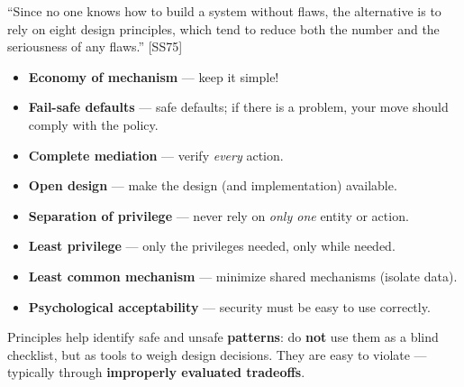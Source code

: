 \begin{keybox}[title=Summary]
``Since no one knows how to build a system without flaws, the alternative is to rely on
eight design principles, which tend to reduce both the number and the seriousness of any
flaws.'' [SS75]
\begin{itemize}
  \item \textbf{Economy of mechanism} --- keep it simple!
  \item \textbf{Fail-safe defaults} --- safe defaults; if there is a problem, your move
        should comply with the policy.
  \item \textbf{Complete mediation} --- verify \emph{every} action.
  \item \textbf{Open design} --- make the design (and implementation) available.
  \item \textbf{Separation of privilege} --- never rely on \emph{only one} entity or
        action.
  \item \textbf{Least privilege} --- only the privileges needed, only while needed.
  \item \textbf{Least common mechanism} --- minimize shared mechanisms (isolate data).
  \item \textbf{Psychological acceptability} --- security must be easy to use correctly.
\end{itemize}
Principles help identify safe and unsafe \textbf{patterns}: do \textbf{not} use them as a
blind checklist, but as tools to weigh design decisions. They are easy to violate ---
typically through \textbf{improperly evaluated tradeoffs}.
\end{keybox}
